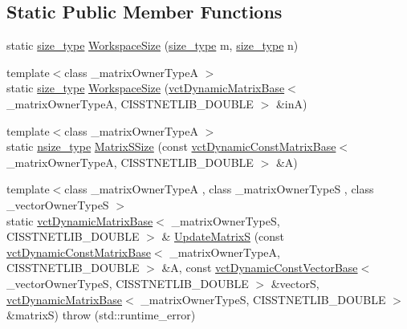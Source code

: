\subsection*{Static Public Member Functions}
\begin{DoxyCompactItemize}
\item 
static \hyperlink{classnmr_s_v_d_economy_dynamic_data_aee8ff15f2e92af24fdc3c7f5908770f3}{size\+\_\+type} \hyperlink{classnmr_s_v_d_economy_dynamic_data_a32eab3e8694ef5e6db13ea76f7ba1460}{Workspace\+Size} (\hyperlink{classnmr_s_v_d_economy_dynamic_data_aee8ff15f2e92af24fdc3c7f5908770f3}{size\+\_\+type} m, \hyperlink{classnmr_s_v_d_economy_dynamic_data_aee8ff15f2e92af24fdc3c7f5908770f3}{size\+\_\+type} n)
\item 
{\footnotesize template$<$class \+\_\+matrix\+Owner\+Type\+A $>$ }\\static \hyperlink{classnmr_s_v_d_economy_dynamic_data_aee8ff15f2e92af24fdc3c7f5908770f3}{size\+\_\+type} \hyperlink{classnmr_s_v_d_economy_dynamic_data_a459cde58b321abda29a67c452e9024f5}{Workspace\+Size} (\hyperlink{classvct_dynamic_matrix_base}{vct\+Dynamic\+Matrix\+Base}$<$ \+\_\+matrix\+Owner\+Type\+A, C\+I\+S\+S\+T\+N\+E\+T\+L\+I\+B\+\_\+\+D\+O\+U\+B\+L\+E $>$ \&in\+A)
\item 
{\footnotesize template$<$class \+\_\+matrix\+Owner\+Type\+A $>$ }\\static \hyperlink{classnmr_s_v_d_economy_dynamic_data_a237cfc6761af61ac2016b2b1e71284f1}{nsize\+\_\+type} \hyperlink{classnmr_s_v_d_economy_dynamic_data_a5cd19015abc8a58fc254c1b4763b9d48}{Matrix\+S\+Size} (const \hyperlink{classvct_dynamic_const_matrix_base}{vct\+Dynamic\+Const\+Matrix\+Base}$<$ \+\_\+matrix\+Owner\+Type\+A, C\+I\+S\+S\+T\+N\+E\+T\+L\+I\+B\+\_\+\+D\+O\+U\+B\+L\+E $>$ \&A)
\item 
{\footnotesize template$<$class \+\_\+matrix\+Owner\+Type\+A , class \+\_\+matrix\+Owner\+Type\+S , class \+\_\+vector\+Owner\+Type\+S $>$ }\\static \hyperlink{classvct_dynamic_matrix_base}{vct\+Dynamic\+Matrix\+Base}$<$ \+\_\+matrix\+Owner\+Type\+S, C\+I\+S\+S\+T\+N\+E\+T\+L\+I\+B\+\_\+\+D\+O\+U\+B\+L\+E $>$ \& \hyperlink{classnmr_s_v_d_economy_dynamic_data_ac7889a8e3afcfa09a985385ca9a87c9d}{Update\+Matrix\+S} (const \hyperlink{classvct_dynamic_const_matrix_base}{vct\+Dynamic\+Const\+Matrix\+Base}$<$ \+\_\+matrix\+Owner\+Type\+A, C\+I\+S\+S\+T\+N\+E\+T\+L\+I\+B\+\_\+\+D\+O\+U\+B\+L\+E $>$ \&A, const \hyperlink{classvct_dynamic_const_vector_base}{vct\+Dynamic\+Const\+Vector\+Base}$<$ \+\_\+vector\+Owner\+Type\+S, C\+I\+S\+S\+T\+N\+E\+T\+L\+I\+B\+\_\+\+D\+O\+U\+B\+L\+E $>$ \&vector\+S, \hyperlink{classvct_dynamic_matrix_base}{vct\+Dynamic\+Matrix\+Base}$<$ \+\_\+matrix\+Owner\+Type\+S, C\+I\+S\+S\+T\+N\+E\+T\+L\+I\+B\+\_\+\+D\+O\+U\+B\+L\+E $>$ \&matrix\+S)  throw (std\+::runtime\+\_\+error)
\end{DoxyCompactItemize}
